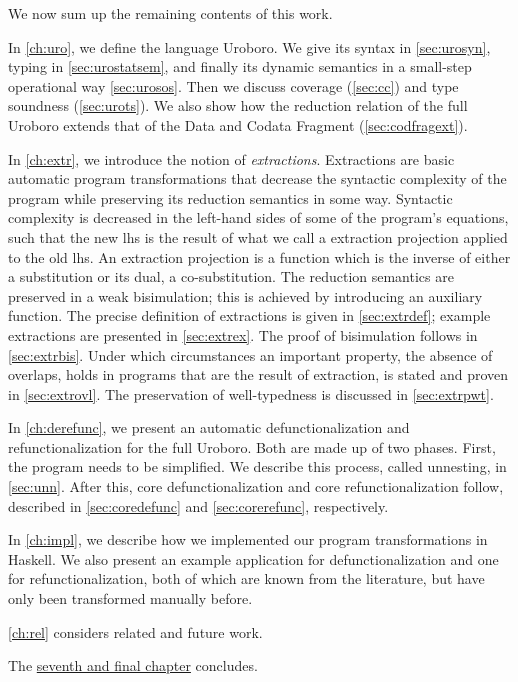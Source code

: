 We now sum up the remaining contents of this work.

In \autoref{ch:uro}, we define the language Uroboro. We give its syntax in \autoref{sec:urosyn}, typing in \autoref{sec:urostatsem}, and finally its dynamic semantics in a small-step operational way \autoref{sec:urosos}. Then we discuss coverage (\autoref{sec:cc}) and type soundness (\autoref{sec:urots}). We also show how the reduction relation of the full Uroboro extends that of the Data and Codata Fragment (\autoref{sec:codfragext}).

In \autoref{ch:extr}, we introduce the notion of \textit{extractions}. Extractions are basic automatic program transformations that decrease the syntactic complexity of the program while preserving its reduction semantics in some way. Syntactic complexity is decreased in the left-hand sides of some of the program's equations, such that the new lhs is the result of what we call a extraction projection applied to the old lhs. An extraction projection is a function which is the inverse of either a substitution or its dual, a co-substitution. The reduction semantics are preserved in a weak bisimulation; this is achieved by introducing an auxiliary function. The precise definition of extractions is given in \autoref{sec:extrdef}; example extractions are presented in \autoref{sec:extrex}. The proof of bisimulation follows in \autoref{sec:extrbis}. Under which circumstances an important property, the absence of overlaps, holds in programs that are the result of extraction, is stated and proven in \autoref{sec:extrovl}. The preservation of well-typedness is discussed in \autoref{sec:extrpwt}.

In \autoref{ch:derefunc}, we present an automatic defunctionalization and refunctionalization for the full Uroboro. Both are made up of two phases. First, the program needs to be simplified. We describe this process, called unnesting, in \autoref{sec:unn}. After this, core defunctionalization and core refunctionalization follow, described in \autoref{sec:coredefunc} and \autoref{sec:corerefunc}, respectively.

In \autoref{ch:impl}, we describe how we implemented our program transformations in Haskell. We also present an example application for defunctionalization and one for refunctionalization, both of which are known from the literature, but have only been transformed manually before.

\autoref{ch:rel} considers related and future work.

The \hyperref[ch:concl]{seventh and final chapter} concludes.
